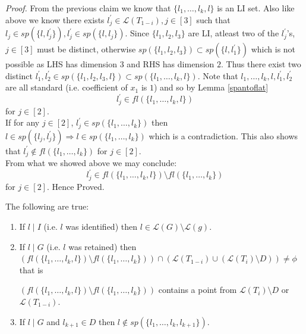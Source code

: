 \documentclass[letterpaper,USenglish,numberwithinsect]{lipics}
\newcommand{\ML}{\mathcal{L}}
\begin{document}
\emph{Proof.}
From the previous claim we know that $\{l_{1},\ldots,l_{k},l\}$ is an LI set.
Also like above we know there exists $l_{j}^\prime \in \ML(T_{1-i}), j\in [3]$
such that $l_{j} \in sp(\{l, l_{j}^\prime\}), l_{j}^\prime \in
sp(\{l, l_{j}\})$. Since $\{l_{1},l_{2},l_{3}\}$ are LI,
atleast two of the $l_{j}^\prime$'s, $j\in [3]$ must be distinct, otherwise
$sp(\{l_{1},l_{2},l_{3}\})\subset sp(\{l,l_{1}^\prime\})$ which is not possible
as LHS has dimension $3$ and RHS has dimension $2$. Thus there exist two
distinct $l_{1}^\prime, l_{2}^\prime \in sp(\{l_{1},l_{2},l_{3},l\})\subset
sp(\{l_{1},\ldots,l_{k},l\})$. Note that $l_1,\ldots,l_k,l,l_1^\prime,l_2^\prime$ are all standard (i.e. coefficient of $x_1$ is $1$)
and so by Lemma \ref{spantoflat}
\[
 l_j^\prime \in fl(\{l_1,\ldots,l_k,l\})
\]
for $j\in [2]$.\\

If for any $j\in [2]$, $l_j^\prime \in
sp(\{l_1,\ldots,l_k\})$ then $l\in sp(\{l_j,l_j^\prime\}) \Rightarrow l\in sp(\{l_1,\ldots,l_k\})$
which is a contradiction. This also shows that $l_j^\prime \notin fl(\{l_1,\ldots,l_k\})$ for $j\in [2]$.\\

 From what we showed above we may conclude:
\[
 l_j^\prime \in fl(\{l_1,\ldots,l_k,l\})\setminus fl(\{l_1,\ldots,l_k\})
\]
for $j\in [2]$. Hence Proved.











\begin{lemma}\label{prooffilteredfactor}
The following are true:
\begin{enumerate}
\item If $l\mid I$ (i.e. $l$ was identified) then $l\in \ML(G)\setminus
\ML(g) $.
\item \label{retainedfactor}If $l\mid G$ (i.e. $l$ was retained) then
$(fl(\{l_{1},\ldots,l_{k},l\})\setminus fl(\{l_{1},\ldots,l_{k}\})) \cap
(\ML(T_{1-i})\cup (\ML(T_i)\setminus D)) \neq \phi $ that is

$(fl(\{l_{1},\ldots,l_{k},l\})\setminus fl(\{l_{1},\ldots,l_{k}\}))$ contains
a point from $\ML(T_i)\setminus D$ or $\ML(T_{1-i})$.

\item \label{retaineddetector} If $l\mid G$ and $l_{k+1}\in D$ then
$l \notin sp(\{l_{1},\ldots,l_{k},l_{k+1}\})$.
    \end{enumerate}
\end{lemma}
\end{document}
